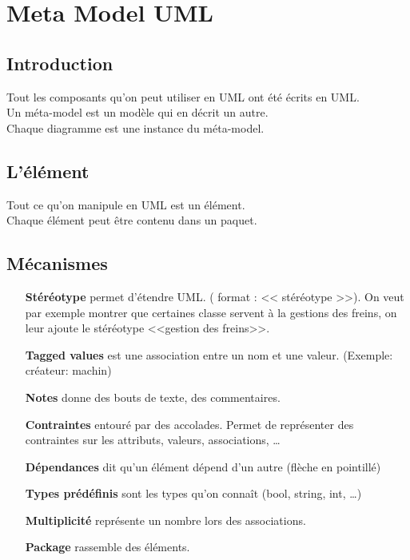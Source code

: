 \section{Meta Model UML}



\subsection{Introduction}
Tout les composants qu’on peut utiliser en UML ont été écrits en UML.
\\Un méta-model est un modèle qui en décrit un autre.
\\Chaque diagramme est une instance du méta-model.



\subsection{L'élément}
Tout ce qu’on manipule en UML est un élément.
\\Chaque élément peut être contenu dans un paquet.



\subsection{Mécanismes}
\begin{itemize}
	\item [\textbf{Stéréotype}] permet d’étendre UML. ( format : << stéréotype >>). On veut par exemple montrer que certaines classe servent à la gestions des freins, on leur ajoute le stéréotype <<gestion des freins>>.
	\item [\textbf{Tagged values}] est une association entre un nom et une valeur. (Exemple: créateur: machin)
	\item [\textbf{Notes}] donne des bouts de texte, des commentaires.
	\item [\textbf{Contraintes}] entouré par des accolades. Permet de représenter des contraintes sur les attributs, valeurs, associations, …
	\item [\textbf{Dépendances}] dit qu’un élément dépend d’un autre (flèche en pointillé)
	\item [\textbf{Types prédéfinis}] sont les types qu’on connaît (bool, string, int, …)
	\item [\textbf{Multiplicité}] représente un nombre lors des associations.
	\item [\textbf{Package}] rassemble des éléments.
\end{itemize}



